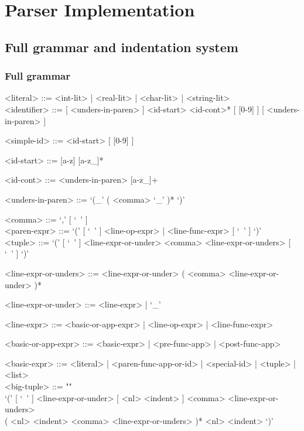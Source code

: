 \documentclass{article}
\begin{document}
\section{Parser Implementation}

\subsection{Full grammar and indentation system}

\subsubsection{Full grammar}

\begin{grammar}

<literal> ::= <int-lit> | <real-lit> | <char-lit> | <string-lit>
\\

<identifier> ::=
[ <unders-in-paren> ] <id-start> <id-cont>* [ [0-9] ] [ <unders-in-paren> ]

<simple-id> ::= <id-start> [ [0-9] ]

<id-start> ::= [a-z] [a-z_]*

<id-cont> ::= <unders-in-paren> [a-z_]+

<unders-in-paren> ::= `(_' ( <comma> `_' )* `)'

<comma> ::= `,' [ `\ ' ]
\\

<paren-expr> ::= `(' [ `\ ' ] <line-op-expr> | <line-func-expr> [ `\ ' ] `)'
\\

<tuple> ::=
`(' [ `\ ' ] <line-expr-or-under> <comma> <line-expr-or-unders> [ `\ ' ] `)'

<line-expr-or-unders> ::=
<line-expr-or-under> ( <comma> <line-expr-or-under> )*

<line-expr-or-under> ::= <line-expr> | `_'

<line-expr> ::= <basic-or-app-expr> | <line-op-expr> | <line-func-expr>

<basic-or-app-expr> ::= <basic-expr> | <pre-func-app> | <post-func-app>

<basic-expr> ::=
<literal> | <paren-func-app-or-id> | <special-id> | <tuple> | <list>
\\

<big-tuple> ::= ""\\
`(' [ `\ ' ] <line-expr-or-under> [ <nl> <indent> ]
<comma> <line-expr-or-unders> \\
( <nl> <indent> <comma> <line-expr-or-unders> )*
<nl> <indent> `)'
\\


\end{grammar}
\end{document}

